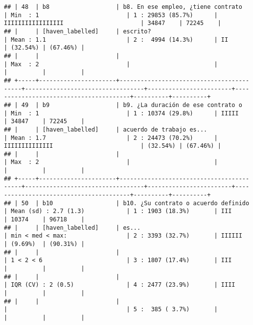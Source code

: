 \documentclass[]{article}
\begin{document}
\begin{verbatim}
## | 48  | b8                   | b8. En ese empleo, ¿tiene contrato       | Min  : 1                         | 1 : 29853 (85.7%)      | IIIIIIIIIIIIIIIII                      | 34847    | 72245    |
## |     | [haven_labelled]     | escrito?                                 | Mean : 1.1                       | 2 :  4994 (14.3%)      | II                                     | (32.54%) | (67.46%) |
## |     |                      |                                          | Max  : 2                         |                        |                                        |          |          |
## +-----+----------------------+------------------------------------------+----------------------------------+------------------------+----------------------------------------+----------+----------+
## | 49  | b9                   | b9. ¿La duración de ese contrato o       | Min  : 1                         | 1 : 10374 (29.8%)      | IIIII                                  | 34847    | 72245    |
## |     | [haven_labelled]     | acuerdo de trabajo es...                 | Mean : 1.7                       | 2 : 24473 (70.2%)      | IIIIIIIIIIIIII                         | (32.54%) | (67.46%) |
## |     |                      |                                          | Max  : 2                         |                        |                                        |          |          |
## +-----+----------------------+------------------------------------------+----------------------------------+------------------------+----------------------------------------+----------+----------+
## | 50  | b10                  | b10. ¿Su contrato o acuerdo definido     | Mean (sd) : 2.7 (1.3)            | 1 : 1903 (18.3%)       | III                                    | 10374    | 96718    |
## |     | [haven_labelled]     | es...                                    | min < med < max:                 | 2 : 3393 (32.7%)       | IIIIII                                 | (9.69%)  | (90.31%) |
## |     |                      |                                          | 1 < 2 < 6                        | 3 : 1807 (17.4%)       | III                                    |          |          |
## |     |                      |                                          | IQR (CV) : 2 (0.5)               | 4 : 2477 (23.9%)       | IIII                                   |          |          |
## |     |                      |                                          |                                  | 5 :  385 ( 3.7%)       |                                        |          |          |

\end{verbatim}
\end{document}
